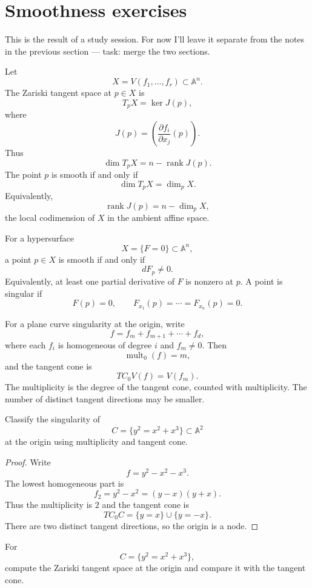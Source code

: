 \section{Smoothness exercises}
\label{section-smoothness-exercises}

\noindent
This is the result of a study session.
For now I'll leave it separate from the notes
in the previous section --- task: merge
the two sections.

\medskip\noindent
Let
$$
X=V(f_1,\dots,f_r)\subset \mathbb{A}^n.
$$
The Zariski tangent space at $p\in X$ is
$$
T_pX=\ker J(p),
$$
where
$$
J(p)=
\left(\frac{\partial f_i}{\partial x_j}(p)\right).
$$
Thus
$$
\dim T_pX=n-\operatorname{rank}J(p).
$$
The point $p$ is smooth if and only if
$$
\dim T_pX=\dim_pX.
$$
Equivalently,
$$
\operatorname{rank}J(p)=n-\dim_pX,
$$
the local codimension of $X$ in the ambient affine
space.

\medskip\noindent
For a hypersurface
$$
X=\{F=0\}\subset \mathbb{A}^n,
$$
a point $p\in X$ is smooth if and only if
$$
dF_p\neq 0.
$$
Equivalently, at least one partial derivative of $F$
is nonzero at $p$. A point is singular if
$$
F(p)=0,
\qquad
F_{x_1}(p)=\cdots=F_{x_n}(p)=0.
$$

\medskip\noindent
For a plane curve singularity at the origin, write
$$
f=f_m+f_{m+1}+\cdots+f_d,
$$
where each $f_i$ is homogeneous of degree $i$ and
$f_m\neq 0$. Then
$$
\operatorname{mult}_0(f)=m,
$$
and the tangent cone is
$$
TC_0V(f)=V(f_m).
$$
The multiplicity is the degree of the tangent cone,
counted with multiplicity. The number of distinct
tangent directions may be smaller.

\begin{exercise}
\label{exercise-smoothness-node}
Classify the singularity of
$$
C=\{y^2=x^2+x^3\}\subset \mathbb{A}^2
$$
at the origin using multiplicity and tangent cone.
\end{exercise}

\begin{proof}
Write
$$
f=y^2-x^2-x^3.
$$
The lowest homogeneous part is
$$
f_2=y^2-x^2=(y-x)(y+x).
$$
Thus the multiplicity is $2$ and the tangent cone is
$$
TC_0C=\{y=x\}\cup \{y=-x\}.
$$
There are two distinct tangent directions, so the
origin is a node.
\end{proof}

\begin{exercise}
\label{exercise-zariski-tangent-node}
For
$$
C=\{y^2=x^2+x^3\},
$$
compute the Zariski tangent space at the origin and
compare it with the tangent cone.
\end{exercise}

